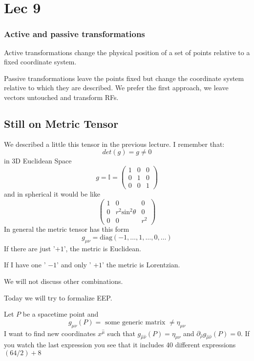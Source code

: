 \section{Lec 9}
\subsubsection{Active and passive transformations}
Active transformations change the physical position of a set of points relative to a fixed coordinate system. \par
Passive transformations leave the points fixed but change the coordinate system relative to which they are described.
We prefer the first approach, we leave vectors untouched and transform RFs.

\subsection{Still on Metric Tensor}
We described a little this tensor in the previous lecture. I remember that:
\[
det\left( g \right) = g \neq 0
\]
in 3D Euclidean Space
\[
	g = \mathbb{I} = \begin{pmatrix}
	1 & 0 & 0 \\
	0 & 1 & 0 \\
	0 & 0 & 1
	\end{pmatrix} 		
\]
and in spherical it would be like
\[
\begin{pmatrix}
1 & 0 & 0 \\
0 & r^{2} \text{sin}^{2}\theta  & 0 \\
0 & 0 & r^{2}
\end{pmatrix} 
\]
In general the metric tensor has this form
\[
	g_{\mu \nu } = \text{diag}\left( -1, \ldots, 1, \ldots , 0, \ldots   \right)
\]
If there are just '$+1$', the metric is Euclidean.\par
If I have one ' $-1$' and only ' $+1$' the metric is Lorentzian.\par
We will not discuss other combinations.

Today we will try to formalize EEP.\par

Let $P$ be a spacetime point and 
\[
g_{\mu \nu }\left( P \right)= \text{ some generic matrix } \neq \eta_{\mu \nu }
\]
I want to find new coordinates $x^{\hat{\mu }}$ such that $g_{\hat{\mu }\hat{\nu }}\left( P \right)=\eta_{\mu \nu }$ and $\partial_{\hat{\rho }}g_{\hat{\mu }\hat{\nu }}\left( P \right)=0$.
If you watch the last expression you see that it includes 40 different expressions $\left( 64/2 \right)+8$

